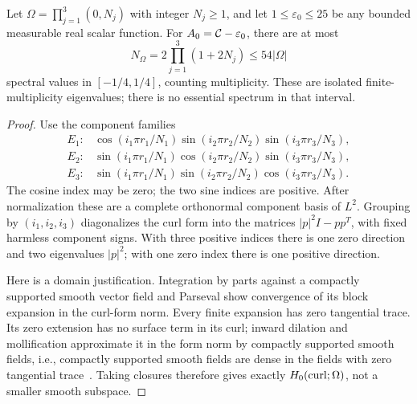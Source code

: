 \begin{lemma}
\label{c:lem:count}
Let $\Omega=\prod_{j=1}^3(0,N_j)$ with integer $N_j\ge1$, and let
$1\le\varepsilon_0\le25$ be any bounded measurable real scalar function.
For $A_0=\mathcal C-\varepsilon_0$, there are at most
\begin{equation}
 N_\Omega=2\prod_{j=1}^3(1+2N_j)\le54|\Omega|             \label{c:eq:count}
\end{equation}
spectral values in $[-1/4,1/4]$, counting multiplicity. These are isolated
finite-multiplicity eigenvalues; there is no essential spectrum in that
interval.
\end{lemma}
\begin{proof}
Use the component families
\[
 \begin{array}{ll}
 E_1:&\cos(i_1\pi r_1/N_1)\sin(i_2\pi r_2/N_2)\sin(i_3\pi r_3/N_3),\\
 E_2:&\sin(i_1\pi r_1/N_1)\cos(i_2\pi r_2/N_2)\sin(i_3\pi r_3/N_3),\\
 E_3:&\sin(i_1\pi r_1/N_1)\sin(i_2\pi r_2/N_2)\cos(i_3\pi r_3/N_3).
 \end{array}
\]
The cosine index may be zero; the two sine indices are positive. After
normalization these are a complete orthonormal component basis of $L^2$.
Grouping by $(i_1,i_2,i_3)$ diagonalizes the curl form into the matrices
$|p|^2I-pp^T$, with fixed harmless component signs. With three
positive indices there is one zero direction and two eigenvalues
$|p|^2$; with one zero index there is one positive direction.

Here is a domain justification. Integration by parts against a compactly
supported smooth vector field and Parseval show convergence of its block
expansion in the curl-form norm. Every finite expansion has zero
tangential trace. Its zero extension has no surface term in its curl;
inward dilation and mollification approximate it in the form norm by
compactly supported smooth fields, i.e., compactly supported smooth fields
are dense in the fields with zero tangential trace~\citep[Chapter~3]{monk2003}. Taking closures therefore gives
exactly $H_0(\operatorname{curl};\Omega)$, not a smaller smooth subspace.


\end{proof}
